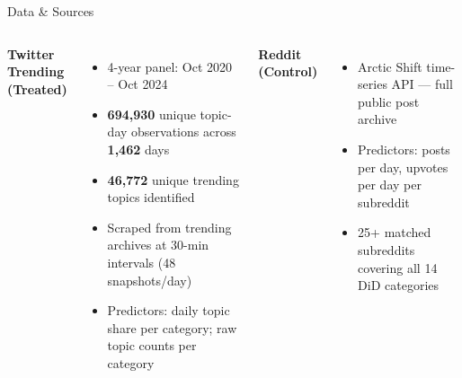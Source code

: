 \documentclass[aspectratio=169,t]{beamer}
\newcommand{\orange}[1]{\textcolor{uteporange}{\textbf{#1}}}
\newcommand{\blue}[1]{\textcolor{utepblue}{\textbf{#1}}}
\begin{document}
\begin{frame}{Data \& Sources}
\begin{columns}[T]
    \blue{Twitter Trending (Treated)}
    \begin{itemize}\setlength\itemsep{0.35em}\small
      \item 4-year panel: Oct 2020 – Oct 2024
      \item \orange{694,930} unique topic-day observations across \orange{1,462} days
      \item \orange{46,772} unique trending topics identified
      \item Scraped from trending archives at 30-min intervals (48 snapshots/day)
      \item Predictors: daily topic share per category; raw topic counts per category
    \end{itemize}

    \blue{Reddit (Control)}
    \begin{itemize}\setlength\itemsep{0.35em}\small
      \item Arctic Shift time-series API — full public post archive
      \item Predictors: posts per day, upvotes per day per subreddit
      \item 25+ matched subreddits covering all 14 DiD categories
    \end{itemize}
\end{columns}
\end{frame}
\end{document}

